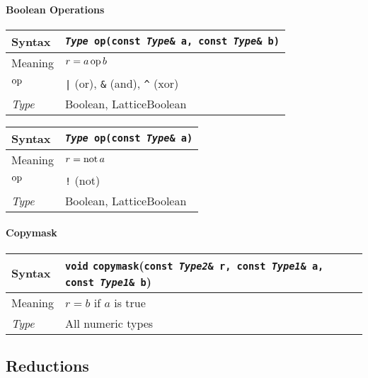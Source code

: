 \documentclass[12pt,letterpaper]{article}
\newcommand{\op}{\mathop{\rm op}}
\renewcommand{\not}{\mathop{\rm not}}
\newcommand{\tLatticeBoolean}{LatticeBoolean}
\newcommand{\tBoolean}{Boolean}
\newcommand{\allNumericTypes}{All numeric types}
\newcommand{\itt}{\it Type}
\newcommand{\protoUnaryQual}[1]{{\tt {\it Type} #1(const {\it Type}\& a)}}
\newcommand{\protoBBinaryQual}[1]{{\tt {\it Type} #1(const {\it Type}\& a, const {\it Type}\& b)}}
\begin{document}
\paragraph{Boolean Operations}

\begin{flushleft}
  \begin{tabular}{|l|l|}
  \hline
  Syntax      & \protoBBinaryQual{op} \\
  \hline
  Meaning     & $r = a \op b$\\
  \hline
  $\op$       & {\tt |} (or), \verb|&| (and), \verb|^| (xor) \\
  \hline
  \itt        & \tBoolean, \tLatticeBoolean\\
  \hline
  \end{tabular}
\end{flushleft}

\begin{flushleft}
  \begin{tabular}{|l|l|}
  \hline
  Syntax      & \protoUnaryQual{op} \\
  \hline
  Meaning     & $r = \not a$\\
  \hline
  $\op$       & \verb|!| (not) \\
  \hline
  \itt        & \tBoolean, \tLatticeBoolean\\
  \hline
  \end{tabular}
\end{flushleft}

\paragraph{Copymask}

\begin{flushleft}
  \begin{tabular}{|l|l|}
  \hline
  Syntax      & {\tt void} \verb|copymask|({\tt const {\it Type2}\&  r, const {\it Type1}\& a, const {\it Type1}\& b})\\
  \hline
  Meaning     & $r = b$ if $a$ is true\\
  \hline
  \itt        & \allNumericTypes \\
  \hline
  \end{tabular}
\end{flushleft}

\subsection{Reductions}
\end{document}
